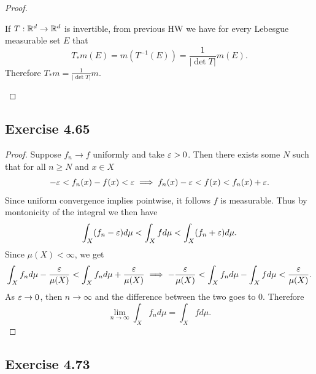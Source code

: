 \documentclass[hw_all.tex]{subfiles}
\begin{document}
\begin{proof}
\begin{enumerate}
            If $T : \mathbb{R}^d \to \mathbb{R}^d$ is invertible, from previous HW we have for every Lebesgue measurable set $E$ that
            \[
                T_* m(E) = m(T^{-1}(E)) = \frac{1}{|\det T|} m(E)
            .\]
            Therefore $T_* m = \frac{1}{|\det T|} m$.
    \end{enumerate}
\end{proof}

\subsection{Exercise 4.65}

\begin{proof}
    Suppose $f_n \to f$ uniformly and take $\varepsilon > 0$. Then there exists some $N$ such that for all $n \geq N$ and $x \in X$
    \[
        -\varepsilon < f_n(x) - f(x) < \varepsilon \implies f_n(x) - \varepsilon < f(x) < f_n(x) + \varepsilon
    .\]
    Since uniform convergence implies pointwise, it follows $f$ is measurable. Thus by montonicity of the integral we then have
    \[
        \int_X (f_n - \varepsilon) d \mu < \int_X f d \mu < \int_X (f_n + \varepsilon) d \mu
    .\]
    Since $\mu(X) < \infty$, we get
    \[
        \int_X f_n d \mu - \frac{\varepsilon}{\mu(X)} < \int_X f_n d \mu + \frac{\varepsilon}{\mu(X)} \implies -\frac{\varepsilon}{\mu(X)} < \int_X f_n d \mu - \int_X f d \mu < \frac{\varepsilon}{\mu(X)}
    .\]
    As $\varepsilon \to 0$, then $n \to \infty$ and the difference between the two goes to $0$. Therefore
    \[
        \lim_{n \to \infty} \int_X f_n d \mu = \int_X f d \mu
    .\]
\end{proof}

\subsection{Exercise 4.73}
\end{document}
